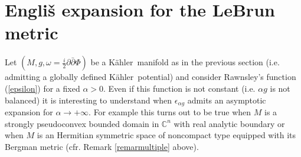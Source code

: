 \documentclass[11pt, reqno]{amsart}
\begin{document}
\section{Engli\v{s} expansion for the LeBrun metric}\label{englis}
Let $(M, g, \omega =\frac{i}{2}\partial\bar\partial\Phi)$ be a {K\"{a}hler}\ manifold as in the previous
section (i.e. admitting a globally defined  {K\"{a}hler}\ potential) and consider Rawnsley's function (\ref{epsilon}) for a fixed $\alpha>0$.
Even if this function is not constant (i.e. $\alpha g$ is not balanced) it is interesting to understand
when   $\epsilon_{\alpha g}$ admits an asymptotic expansion for $\alpha\rightarrow+\infty$.
For example this  turns out to be true
when $M$ is  a strongly pseudoconvex  bounded domain in
${\mathbb{C}}^n$ with real analytic boundary or when $M$ is an Hermitian symmetric space of noncompact type equipped with its Bergman metric (cfr. Remark \ref{remarmultiple} above).
\end{document}
